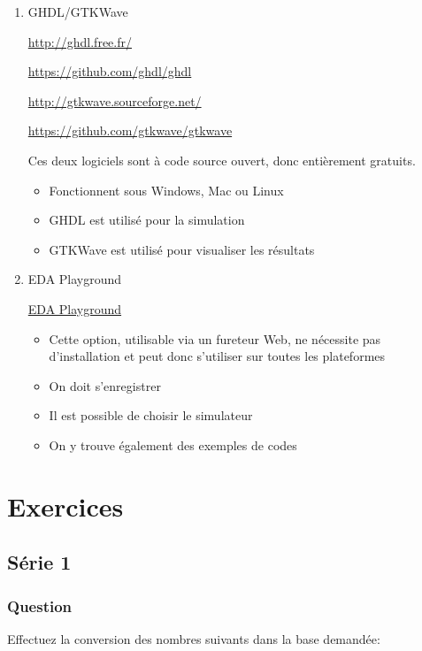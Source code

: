 \documentclass[letter, oneside]{book}
\begin{document}
\begin{enumerate}
\item GHDL/GTKWave
\label{sec:orgf3ed052}

\url{http://ghdl.free.fr/}

\url{https://github.com/ghdl/ghdl}

\url{http://gtkwave.sourceforge.net/}

\url{https://github.com/gtkwave/gtkwave}

Ces deux logiciels sont à code source ouvert, donc entièrement
gratuits.

\begin{itemize}
\item Fonctionnent sous Windows, Mac ou Linux
\item GHDL est utilisé pour la simulation
\item GTKWave est utilisé pour visualiser les résultats
\end{itemize}

\item EDA Playground
\label{sec:org3e1d484}

\href{https://www.edaplayground.com/}{EDA Playground}

\begin{itemize}
\item Cette option, utilisable via un fureteur Web, ne nécessite pas
d'installation et peut donc s'utiliser sur toutes les plateformes
\item On doit s'enregistrer
\item Il est possible de choisir le simulateur
\item On y trouve également des exemples de codes
\end{itemize}
\end{enumerate}

\part{Exercices}
\label{sec:org785118c}

\chapter*{Série 1}
\label{sec:org64ecb65}
\section*{Question}
\label{sec:org4d72a88}
Effectuez la conversion des nombres suivants dans la base demandée:
\end{document}
